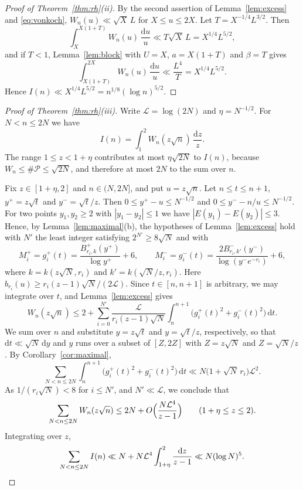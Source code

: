 \documentclass[11pt,reqno]{amsart}
\theoremstyle{definition}
\theoremstyle{remark}
\numberwithin{equation}{section}
\newcommand{\dd}{\mathrm{d}}
\newcommand{\cP}{\mathcal{P}}
\begin{document}
\begin{proof}[Proof of Theorem~\ref{thm:rh}\textup{(ii)}]
By the second assertion of Lemma~\ref{lem:excess} and \eqref{eq:vonkoch}, $W_n(u)\ll\sqrt X\,L$ for $X\le u\le2X$. Let $T=X^{-1/4}L^{3/2}$. Then
\[
 \int_X^{X(1+T)}W_n(u)\,\frac{\dd u}{u}\ll T\sqrt X\,L=X^{1/4}L^{5/2},
\]
and if $T<1$, Lemma~\ref{lem:block} with $U=X$, $a=X(1+T)$ and $\beta=T$ gives
\[
 \int_{X(1+T)}^{2X}W_n(u)\,\frac{\dd u}{u}\ll\frac{L^4}{T}=X^{1/4}L^{5/2}.
\]
Hence $I(n)\ll X^{1/4}L^{5/2}=n^{1/8}(\log n)^{5/2}$.
\end{proof}

\begin{proof}[Proof of Theorem~\ref{thm:rh}\textup{(iii)}]
Write $\mathcal L=\log(2N)$ and $\eta=N^{-1/2}$. For $N<n\le2N$ we have
\[
 I(n)=\int_1^2W_n(z\sqrt n)\,\frac{\dd z}{z}.
\]
The range $1\le z<1+\eta$ contributes at most $\eta\sqrt{2N}$ to $I(n)$, because $W_n\le\#\cP\le\sqrt{2N}$, and therefore at most $2N$ to the sum over $n$.

Fix $z\in[1+\eta,2]$ and $n\in(N,2N]$, and put $u=z\sqrt n$. Let $n\le t\le n+1$, $y^+=z\sqrt t$ and $y^-=\sqrt t/z$. Then $0\le y^+-u\le N^{-1/2}$ and $0\le y^--n/u\le N^{-1/2}$. For two points $y_1,y_2\ge2$ with $|y_1-y_2|\le1$ we have $|E(y_1)-E(y_2)|\le3$. Hence, by Lemma~\ref{lem:maximal}(b), the hypotheses of Lemma~\ref{lem:excess} hold with $N'$ the least integer satisfying $2^{N'}\ge8\sqrt N$ and with
\[
 M_i^+=g_i^+(t)=\frac{B^+_{r_i,k}(y^+)}{\log y^+}+6,\qquad M_i^-=g_i^-(t)=\frac{2B^-_{r_i,k'}(y^-)}{\log(y^-e^{-r_i})}+6,
\]
where $k=k(z\sqrt N,r_i)$ and $k'=k(\sqrt N/z,r_i)$. Here $b_{r_i}(u)\ge r_i(z-1)\sqrt N/(2\mathcal L)$. Since $t\in[n,n+1]$ is arbitrary, we may integrate over $t$, and Lemma~\ref{lem:excess} gives
\[
 W_n(z\sqrt n)\le2+\sum_{i=0}^{N'}\frac{\mathcal L}{r_i(z-1)\sqrt N}\int_n^{n+1}\bigl(g_i^+(t)^2+g_i^-(t)^2\bigr)\,\dd t .
\]
We sum over $n$ and substitute $y=z\sqrt t$ and $y=\sqrt t/z$, respectively, so that $\dd t\ll\sqrt N\,\dd y$ and $y$ runs over a subset of $[Z,2Z]$ with $Z=z\sqrt N$ and $Z=\sqrt N/z$. By Corollary~\ref{cor:maximal},
\[
 \sum_{N<n\le2N}\int_n^{n+1}\bigl(g_i^+(t)^2+g_i^-(t)^2\bigr)\,\dd t\ll N\bigl(1+\sqrt N\,r_i\bigr)\mathcal L^2 .
\]
As $1/(r_i\sqrt N)<8$ for $i\le N'$, and $N'\ll\mathcal L$, we conclude that
\[
 \sum_{N<n\le2N}W_n(z\sqrt n)\le2N+O\Bigl(\frac{N\mathcal L^4}{z-1}\Bigr)\qquad(1+\eta\le z\le2).
\]
Integrating over $z$,
\[
 \sum_{N<n\le2N}I(n)\ll N+N\mathcal L^4\int_{1+\eta}^2\frac{\dd z}{z-1}\ll N(\log N)^5 .\qedhere
\]
\end{proof}
\end{document}
